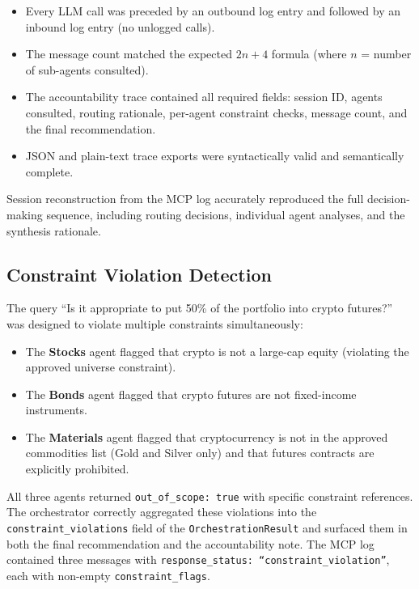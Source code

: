 \documentclass[runningheads]{llncs}
\begin{document}
\begin{itemize}
    \item Every LLM call was preceded by an outbound log entry and followed by an inbound log entry (no unlogged calls).
    \item The message count matched the expected $2n + 4$ formula (where $n$ = number of sub-agents consulted).
    \item The accountability trace contained all required fields: session ID, agents consulted, routing rationale, per-agent constraint checks, message count, and the final recommendation.
    \item JSON and plain-text trace exports were syntactically valid and semantically complete.
\end{itemize}

Session reconstruction from the MCP log accurately reproduced the full decision-making sequence, including routing decisions, individual agent analyses, and the synthesis rationale.

\subsection{Constraint Violation Detection}

The query ``Is it appropriate to put 50\% of the portfolio into crypto futures?'' was designed to violate multiple constraints simultaneously:
\begin{itemize}
    \item The \textbf{Stocks} agent flagged that crypto is not a large-cap equity (violating the approved universe constraint).
    \item The \textbf{Bonds} agent flagged that crypto futures are not fixed-income instruments.
    \item The \textbf{Materials} agent flagged that cryptocurrency is not in the approved commodities list (Gold and Silver only) and that futures contracts are explicitly prohibited.
\end{itemize}

All three agents returned \texttt{out\_of\_scope: true} with specific constraint references. The orchestrator correctly aggregated these violations into the \texttt{constraint\_violations} field of the \texttt{OrchestrationResult} and surfaced them in both the final recommendation and the accountability note. The MCP log contained three messages with \texttt{response\_status: ``constraint\_violation''}, each with non-empty \texttt{constraint\_flags}.
\end{document}
